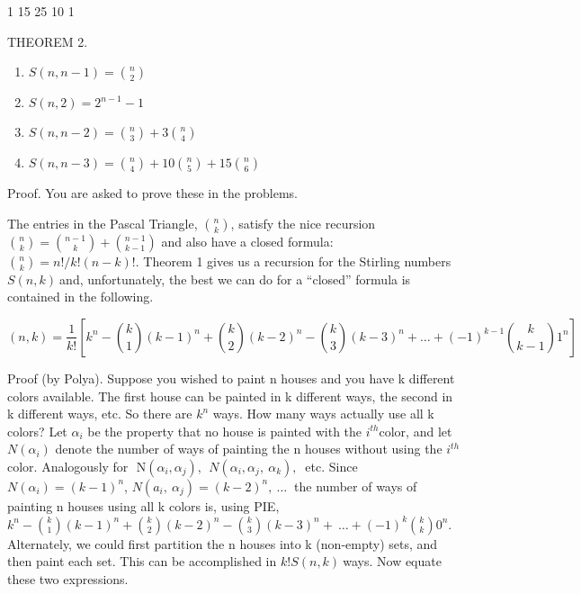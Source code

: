 1 15 25 10 1

THEOREM 2.
\begin{enumerate}
\def\labelenumi{(\alph{enumi})}

\item
  \(S\left( n,n - 1 \right) =\binom{n}{2}
\)
\item
  \(S\left( n,2 \right) = 2^{n - 1} - 1\)
\item
  \(S\left( n,n - 2 \right) =\binom{n}{3}
 + 3\binom{n}{4}
\)
\item
  \(S\left( n,n - 3 \right) =\binom{n}{4}
 + 10\binom{n}{5}
 + 15\binom{n}{6}
\)

\end{enumerate}

Proof. You are asked to prove these in the problems.

The entries in the Pascal Triangle, \(\binom{n}{k}
\), satisfy the nice recursion \(\binom{n}{k}
 =
\binom{n - 1}{k}
 +\binom{n - 1}{k - 1}
\) and also have a closed formula: \(\binom{n}{k}
 = n!/k!\left( n - k \right)!\). Theorem 1 gives us a
recursion for the Stirling numbers \(S\left( n,k \right)\ \)and,
unfortunately, the best we can do for a ``closed'' formula is contained
in the following.

\[
\left( n,k \right) = \frac{1}{k!}\left\lbrack k^{n} - \binom{k}{1} \left( k - 1 \right)^{n} + \binom{k}{2} \left( k - 2 \right)^{n} - \binom{k}{3} \left( k - 3 \right)^{n} + \ldots + \left( - 1 \right)^{k - 1}\binom{k}{k - 1} 1^{n} \right\rbrack
\]

Proof (by Polya). Suppose you wished to paint n houses and you have k
different colors available. The first house can be painted in k
different ways, the second in k different ways, etc. So there are
\(k^{n}\) ways. How many ways actually use all k colors? Let
\(\alpha_{i}\) be the property that no house is painted with the
\(i^{th}\)color, and let \(N(\alpha_{i})\) denote the number of ways of
painting the n houses without using the \(i^{th}\)color. Analogously for
\(\text{\ N}\left( \alpha_{i},\alpha_{j} \right),\ \ N\left( \alpha_{i},\alpha_{j},\ \alpha_{k} \right),\ \)
etc. Since \(N\left( \alpha_{i} \right) = \left( k - 1 \right)^{n}\),
\(N\left( a_{i},\ \alpha_{j} \right) = \left( k - 2 \right)^{n},\ \ldots\ \)
the number of ways of painting n houses using all k colors is, using
PIE, \(k^{n} -\binom{k}{1}
\left( k - 1 \right)^{n} +
\binom{k}{2}
\left( k - 2 \right)^{n} -
\binom{k}{3}
\left( k - 3 \right)^{n} + \ \ldots + \left( - 1 \right)^{k}
\binom{k}{k}
0^{n}\). Alternately, we could first partition the n houses
into k (non-empty) sets, and then paint each set. This can be
accomplished in \(k!S\left( n,k \right)\ \)ways. Now equate these two
expressions.

